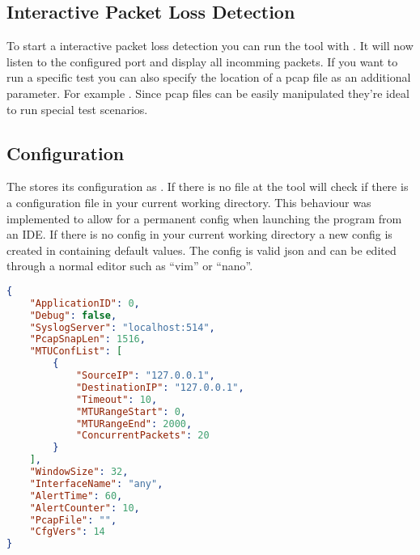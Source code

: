 \subsection{Interactive Packet Loss Detection}
To start a interactive packet loss detection you can run the tool with . It will now listen to the configured port and display all incomming packets. If you want to run a specific test you can also specify the location of a pcap file as an additional parameter. For example . Since pcap files can be easily manipulated they're ideal to run special test scenarios.
\clearpage
\subsection{Configuration}
The \entool{} stores its configuration as . If there is no  file at  the tool will check if there is a configuration file in your current working directory. This behaviour was implemented to allow for a permanent config when launching the program from an \acs{IDE}. If there is no config in your current working directory a new config is created in  containing default values.
The config is valid json and can be edited through a normal editor such as \enquote{vim} or \enquote{nano}.

\begin{lstlisting}[language=json, caption=Sample configuration]
{
    "ApplicationID": 0,
    "Debug": false,
    "SyslogServer": "localhost:514",
    "PcapSnapLen": 1516,
    "MTUConfList": [
        {
            "SourceIP": "127.0.0.1",
            "DestinationIP": "127.0.0.1",
            "Timeout": 10,
            "MTURangeStart": 0,
            "MTURangeEnd": 2000,
            "ConcurrentPackets": 20
        }
    ],
    "WindowSize": 32,
    "InterfaceName": "any",
    "AlertTime": 60,
    "AlertCounter": 10,
    "PcapFile": "", 
    "CfgVers": 14
}
\end{lstlisting}
